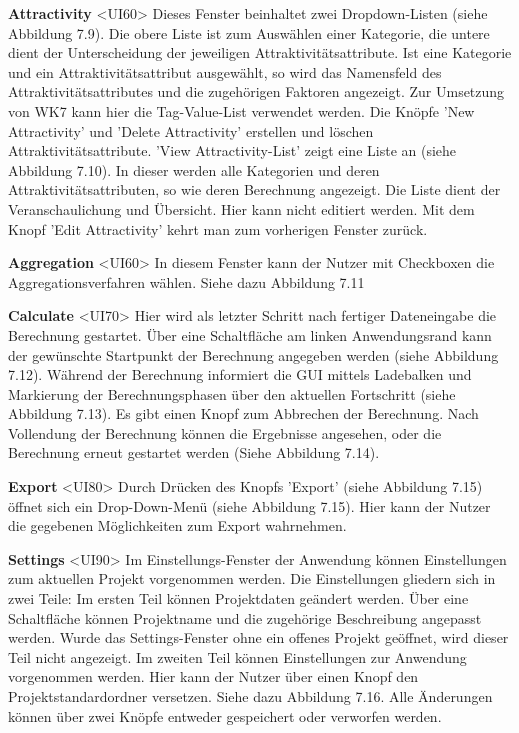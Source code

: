 \documentclass[parskip=full]{scrartcl} %
\begin{document}
\textbf{Attractivity }<UI60>
Dieses Fenster beinhaltet zwei Dropdown-Listen (siehe Abbildung 7.9). Die obere Liste ist zum Auswählen einer Kategorie, die untere dient der Unterscheidung der jeweiligen 
Attraktivitätsattribute.
Ist eine Kategorie und ein Attraktivitätsattribut ausgewählt, so wird das Namensfeld des Attraktivitätsattributes und die zugehörigen Faktoren angezeigt. Zur Umsetzung von WK7 kann hier die Tag-Value-List verwendet werden.
Die Knöpfe 'New Attractivity' und 'Delete Attractivity' erstellen und löschen Attraktivitätsattribute. 'View Attractivity-List' zeigt eine Liste an (siehe Abbildung 7.10). In dieser werden alle Kategorien und deren Attraktivitätsattributen, so wie deren Berechnung angezeigt.
Die Liste dient der Veranschaulichung und Übersicht. Hier kann nicht editiert werden.
Mit dem Knopf 'Edit Attractivity' kehrt man zum vorherigen Fenster zurück.

\textbf{Aggregation }<UI60>
In diesem Fenster kann der Nutzer mit Checkboxen die Aggregationsverfahren wählen. Siehe dazu Abbildung 7.11

\textbf{Calculate }<UI70>
Hier wird als letzter Schritt nach fertiger Dateneingabe die Berechnung gestartet. Über eine Schaltfläche am linken Anwendungsrand kann der gewünschte Startpunkt der Berechnung angegeben werden (siehe Abbildung 7.12). Während der Berechnung informiert die GUI mittels Ladebalken und Markierung der Berechnungsphasen über den aktuellen Fortschritt (siehe Abbildung 7.13). Es gibt einen Knopf zum Abbrechen der Berechnung. Nach Vollendung der Berechnung können die Ergebnisse angesehen, oder die Berechnung erneut gestartet werden (Siehe Abbildung 7.14).

\textbf{Export }<UI80>
Durch Drücken des Knopfs 'Export' (siehe Abbildung 7.15) öffnet sich ein Drop-Down-Menü (siehe Abbildung 7.15). Hier kann der Nutzer die gegebenen Möglichkeiten zum Export wahrnehmen.

\newpage
\textbf{Settings }<UI90>
Im Einstellungs-Fenster der Anwendung können Einstellungen zum aktuellen Projekt vorgenommen werden.
Die Einstellungen gliedern sich in zwei Teile:
Im ersten Teil können Projektdaten geändert werden. Über eine Schaltfläche können Projektname und die zugehörige Beschreibung angepasst werden. Wurde das Settings-Fenster ohne ein offenes Projekt geöffnet, wird dieser Teil nicht angezeigt.
Im zweiten Teil können Einstellungen zur Anwendung vorgenommen werden. Hier kann der Nutzer über einen Knopf den Projektstandardordner versetzen. Siehe dazu Abbildung 7.16.
Alle Änderungen können über zwei Knöpfe entweder gespeichert oder verworfen werden.
\end{document}
